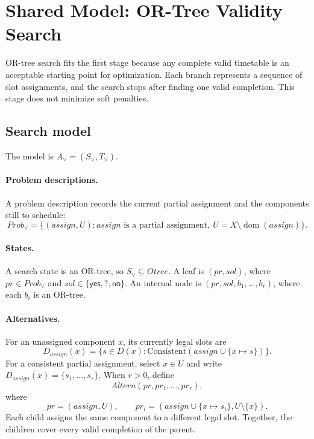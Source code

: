 \section{Shared Model: OR-Tree Validity Search}
\label{sec:or}

OR-tree search fits the first stage because any complete
valid timetable is an acceptable starting point for
optimization. Each branch represents a sequence of slot
assignments, and the search stops after finding one valid
completion. This stage does not minimize soft penalties.

\subsection{Search model}
\label{sec:or-model}

The model is $A_{\lor}=(S_{\lor},T_{\lor})$.

\paragraph{Problem descriptions.}
A problem description records the current partial assignment
and the components still to schedule:
\[
\mathit{Prob}_{\lor}
=\{(\mathit{assign},U):
  \mathit{assign}\text{ is a partial assignment},\
  U=X\setminus\operatorname{dom}(\mathit{assign})\}.
\]

\paragraph{States.}
A search state is an OR-tree, so
$S_{\lor}\subseteq\mathit{Otree}$.
A leaf is $(pr,sol)$, where
$pr\in\mathit{Prob}_{\lor}$ and
$sol\in\{\mathsf{yes},?,\mathsf{no}\}$.
An internal node is $(pr,sol,b_1,\ldots,b_r)$,
where each $b_i$ is an OR-tree.

\paragraph{Alternatives.}
For an unassigned component $x$, its currently legal slots are
\[
D_{\mathit{assign}}(x)
=\{s\in D(x):
  \mathrm{Consistent}(
    \mathit{assign}\cup\{x\mapsto s\})\}.
\]
For a consistent partial assignment, select $x\in U$ and
write $D_{\mathit{assign}}(x)=\{s_1,\ldots,s_r\}$.
When $r>0$, define
\[
\mathit{Altern}(pr,pr_1,\ldots,pr_r),
\]
where
\[
pr=(\mathit{assign},U),
\qquad
pr_i=
(\mathit{assign}\cup\{x\mapsto s_i\},U\setminus\{x\}).
\]
Each child assigns the same component to a different legal
slot. Together, the children cover every valid completion
of the parent.

